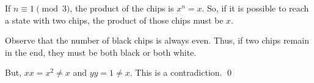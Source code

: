 If $n\equiv 1\pmod 3$, the product of the chips is $x^n=x$.  So, if it is possible to reach a state with two chips, the product of those chips must be $x$.  

Observe that the number of black chips is always even.  Thus, if two chips remain in the end, they must be both black or both white.  

But, $xx=x^2\neq x$ and $yy=1\neq x$.  This is a contradiction.  \qed
